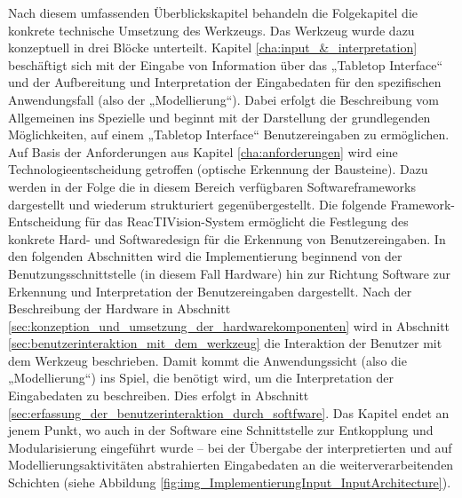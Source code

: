 Nach diesem umfassenden Überblickskapitel behandeln die Folgekapitel die konkrete technische Umsetzung des Werkzeugs. Das Werkzeug wurde dazu konzeptuell in drei Blöcke unterteilt. Kapitel \ref{cha:input_&_interpretation} beschäftigt sich mit der Eingabe von Information über das „Tabletop Interface“ und der Aufbereitung und Interpretation der Eingabedaten für den spezifischen Anwendungsfall (also der „Modellierung“). Dabei erfolgt die Beschreibung vom Allgemeinen ins Spezielle und beginnt mit der Darstellung der grundlegenden Möglichkeiten, auf einem „Tabletop Interface“ Benutzereingaben zu ermöglichen. Auf Basis der Anforderungen aus Kapitel \ref{cha:anforderungen} wird eine Technologieentscheidung getroffen (optische Erkennung der Bausteine). Dazu werden in der Folge die in diesem Bereich verfügbaren Softwareframeworks dargestellt und wiederum strukturiert gegenübergestellt. Die folgende Framework-Entscheidung für das ReacTIVision-System \citep{Kaltenbrunner07} ermöglicht die Festlegung des konkrete Hard- und Softwaredesign für die Erkennung von Benutzereingaben. In den folgenden Abschnitten wird die Implementierung beginnend von der Benutzungsschnittstelle (in diesem Fall Hardware) hin zur Richtung Software zur Erkennung und Interpretation der Benutzereingaben dargestellt. Nach der Beschreibung der Hardware in Abschnitt \ref{sec:konzeption_und_umsetzung_der_hardwarekomponenten} wird in Abschnitt \ref{sec:benutzerinteraktion_mit_dem_werkzeug} die Interaktion der Benutzer mit dem Werkzeug beschrieben. Damit kommt die Anwendungssicht (also die „Modellierung“) ins Spiel, die benötigt wird, um die Interpretation der Eingabedaten zu beschreiben. Dies erfolgt in Abschnitt \ref{sec:erfassung_der_benutzerinteraktion_durch_softfware}. Das Kapitel endet an jenem Punkt, wo auch in der Software eine Schnittstelle zur Entkopplung und Modularisierung eingeführt wurde -- bei der Übergabe der interpretierten und auf Modellierungsaktivitäten abstrahierten Eingabedaten an die weiterverarbeitenden Schichten (siehe Abbildung \ref{fig:img_ImplementierungInput_InputArchitecture}).

